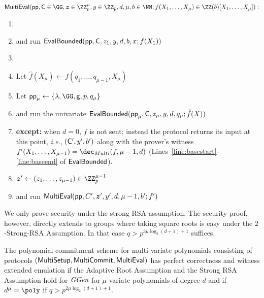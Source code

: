  \begin{mdframed}
\begin{minipage}{\textwidth}
			$\pro{MultiEval}(\params, \gr{C}\in \GG, \boldsymbol{z}\in \ZZ^\mu_p,y \in \ZZ_p, d,\mu,b \in \NN; f(X_1,\dots,X_\mu)\in \ZZ(b)[X_1, \ldots, X_\mu]) :$
			\begin{enumerate}[nolistsep]
			\item {} 
			\item \pcind[1] \prover and \verifier run $\textsf{{EvalBounded}}(\textsf{pp},\mathsf{C},z_1,y,d,b,x;f(X_1))$ 
			\item \pcelse
			\item \pcind[1] Let $\hat{f}(X_\mu)\gets f(q_1,\dots,q_{\mu-1},X_\mu)$
			\item \pcind[1] Let $\crs_\mu \gets \{\lambda,\GG,\gr{g},p,q_\mu\}$
			\item \pcind[1] \prover and \verifier run the univariate $\textsf{{EvalBounded}}(\textsf{pp}_\mu,\mathsf{C},z_\mu,y,d,q_\mu;\hat{f}(X))$
			\item \pcind[2] \textbf{except:} when $d=0$, $f$ is not sent; instead the protocol returns its input at this point, \emph{i.e.}, $(\mathsf{C}',y',b')$ along with the prover's witness $f'(X_1,\dots,X_{\mu-1})=\dec_{Multi}(f,\mu-1,d)$ (Lines~\ref{line:basestart}-\ref{line:baseend} of $\textsf{{EvalBounded}}$). 
			\item \pcind[1]$\boldsymbol{z}'\gets (z_1,\dots,z_{\mu-1})\in \ZZ_p^{\mu-1}$
			\item \pcind[1]\prover and \verifier run $\textsf{{MultiEval}}(\textsf{pp},C',\boldsymbol{z}',y',d,\mu-1,b';f')$
		    \end{enumerate}
      \end{minipage}
\end{mdframed}
We only prove security under the strong RSA assumption. The security proof, however, directly extends to groups where taking square roots is easy under the $2$-Strong-RSA Assumption. In that case $q>p^{3\mu \log_2(d+1)+1}$ suffices.
\begin{theorem}
	The polynomial commitment scheme for multi-variate polynomials consisting of protocols $(\textsf{{MultiSetup}},\textsf{{MultiCommit}},\textsf{{MultiEval}})$ has perfect correctness and witness extended emulation if the Adaptive Root Assumption and the Strong RSA Assumption hold for $\textit{GGen}$ for $\mu$-variate polynomials of degree $d$ and if $d^\mu=\poly$ if $q> p^{2 \mu \log_2(d+1)+1}$.
\end{theorem}
